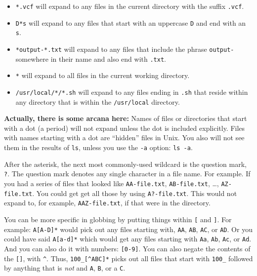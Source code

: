 \documentclass[]{krantz}
\providecommand{\tightlist}{%
  \setlength{\itemsep}{0pt}\setlength{\parskip}{0pt}}
\let\BeginKnitrBlock\begin \let\EndKnitrBlock\end
\begin{document}
\begin{itemize}
\tightlist
\item
  \texttt{*.vcf} will expand to any files in the current directory with the suffix \texttt{.vcf}.
\item
  \texttt{D*s} will expand to any files that start with an uppercase \texttt{D} and end with an \texttt{s}.
\item
  \texttt{*output-*.txt} will expand to any files that include the phrase \texttt{output-} somewhere
  in their name and also end with \texttt{.txt}.
\item
  \texttt{*} will expand to all files in the current working directory.
\item
  \texttt{/usr/local/*/*.sh} will expand to any files ending in \texttt{.sh} that reside within any directory that
  is within the \texttt{/usr/local} directory.
\end{itemize}

\BeginKnitrBlock{rmdnote}
\textbf{Actually, there is some arcana here:} Names of files or directories that start with a
dot (a period) will not expand unless the
dot is included explicitly. Files with names starting with a dot are
``hidden'' files in Unix. You also will not see them in the results of \texttt{ls}, unless you
use the \texttt{-a} option: \texttt{ls\ -a}.
\EndKnitrBlock{rmdnote}

After the asterisk, the next most commonly-used wildcard is the question mark, \texttt{?}. The question mark
denotes any single character in a file name. For example. If you had a series of files that looked
like \texttt{AA-file.txt}, \texttt{AB-file.txt}, \ldots{}, \texttt{AZ-file.txt}. You could get get all those by
using \texttt{A?-file.txt}. This would not expand to, for example, \texttt{AAZ-file.txt}, if that were in the directory.

You can be more specific in globbing by putting things within \texttt{{[}} and \texttt{{]}}. For example:
\texttt{A{[}A-D{]}*} would pick out any files starting with, \texttt{AA}, \texttt{AB}, \texttt{AC}, or \texttt{AD}. Or you could
have said \texttt{A{[}a-d{]}*} which would get any files starting with \texttt{Aa}, \texttt{Ab}, \texttt{Ac}, or \texttt{Ad}. And you
can also do it with numbers: \texttt{{[}0-9{]}}. You can also negate the contents of the \texttt{{[}{]}}, with \texttt{\^{}}. Thus,
\texttt{100\_{[}\^{}ABC{]}*} picks out all files that start with \texttt{100\_} followed by anything that is \emph{not} and \texttt{A}, \texttt{B}, or a \texttt{C}.
\end{document}
